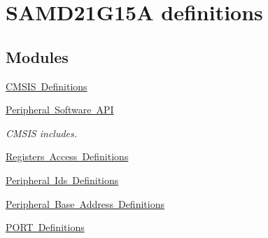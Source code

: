 \hypertarget{group___s_a_m_d21_g15_a__definitions}{}\section{S\+A\+M\+D21\+G15A definitions}
\label{group___s_a_m_d21_g15_a__definitions}
\subsection*{Modules}
\begin{DoxyCompactItemize}
\item 
\mbox{\hyperlink{group___s_a_m_d21_g15_a__cmsis}{C\+M\+S\+I\+S Definitions}}
\item 
\mbox{\hyperlink{group___s_a_m_d21_g15_a__api}{Peripheral Software A\+PI}}
\begin{DoxyCompactList}\small\item\em C\+M\+S\+IS includes. \end{DoxyCompactList}\item 
\mbox{\hyperlink{group___s_a_m_d21_g15_a__reg}{Registers Access Definitions}}
\item 
\mbox{\hyperlink{group___s_a_m_d21_g15_a__id}{Peripheral Ids Definitions}}
\item 
\mbox{\hyperlink{group___s_a_m_d21_g15_a__base}{Peripheral Base Address Definitions}}
\item 
\mbox{\hyperlink{group___s_a_m_d21_g15_a__port}{P\+O\+R\+T Definitions}}
\end{DoxyCompactItemize}
